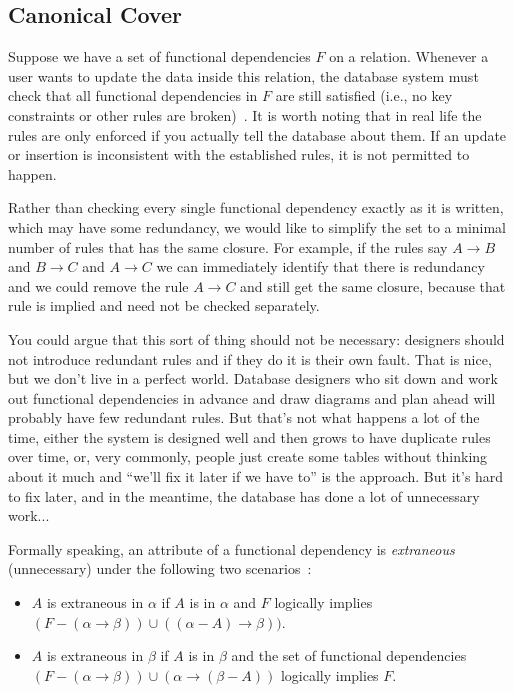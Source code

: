 \subsection*{Canonical Cover}
Suppose we have a set of functional dependencies $F$ on a relation. Whenever a user wants to update the data inside this relation, the database system must check that all functional dependencies in $F$ are still satisfied (i.e., no key constraints or other rules are broken)~\cite{dsc}. It is worth noting that in real life the rules are only enforced if you actually tell the database about them. If an update or insertion is inconsistent with the established rules, it is not permitted to happen.

Rather than checking every single functional dependency exactly as it is written, which may have some redundancy, we would like to simplify the set to a minimal number of rules that has the same closure. For example, if the rules say $A \rightarrow B$ and $B \rightarrow C$ and $A \rightarrow C$ we can immediately identify that there is redundancy and we could remove the rule $A \rightarrow C$ and still get the same closure, because that rule is implied and need not be checked separately.

You could argue that this sort of thing should not be necessary: designers should not introduce redundant rules and if they do it is their own fault. That is nice, but we don't live in a perfect world. Database designers who sit down and work out functional dependencies in advance and draw diagrams and plan ahead will probably have few redundant rules. But that's not what happens a lot of the time, either the system is designed well and then grows to have duplicate rules over time, or, very commonly, people just create some tables without thinking about it much and ``we'll fix it later if we have to'' is the approach. But it's hard to fix later, and in the meantime, the database has done a lot of unnecessary work...

Formally speaking, an attribute of a functional dependency is \textit{extraneous} (unnecessary) under the following two scenarios~\cite{dsc}:
\begin{itemize}
	\item $A$ is extraneous in $\alpha$ if $A$ is in $\alpha$ and $F$ logically implies $(F - (\alpha \rightarrow \beta)) \cup ((\alpha - A) \rightarrow \beta))$.
	\item $A$ is extraneous in $\beta$ if $A$ is in $\beta$ and the set of functional dependencies $(F - (\alpha \rightarrow \beta)) \cup (\alpha \rightarrow (\beta - A))$ logically implies $F$.
\end{itemize}

